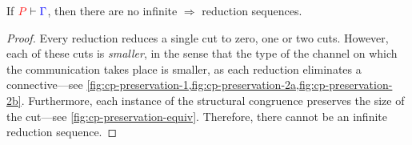\begin{theorem}[Termination]\label{thm:cp-termination}
  If $\seq[{ P }]{ \Gamma }$, then there are no infinite $\Longrightarrow$
  reduction sequences.
\end{theorem}
\begin{proof}
  Every reduction reduces a single cut to zero, one or two cuts.
  However, each of these cuts is \emph{smaller}, in the sense that the type of
  the channel on which the communication takes place is smaller, as each
  reduction eliminates a connective---see
  \cref{fig:cp-preservation-1,fig:cp-preservation-2a,fig:cp-preservation-2b}.
  Furthermore, each instance of the structural congruence preserves the size
  of the cut---see \cref{fig:cp-preservation-equiv}.
  Therefore, there cannot be an infinite reduction sequence.
\end{proof}
